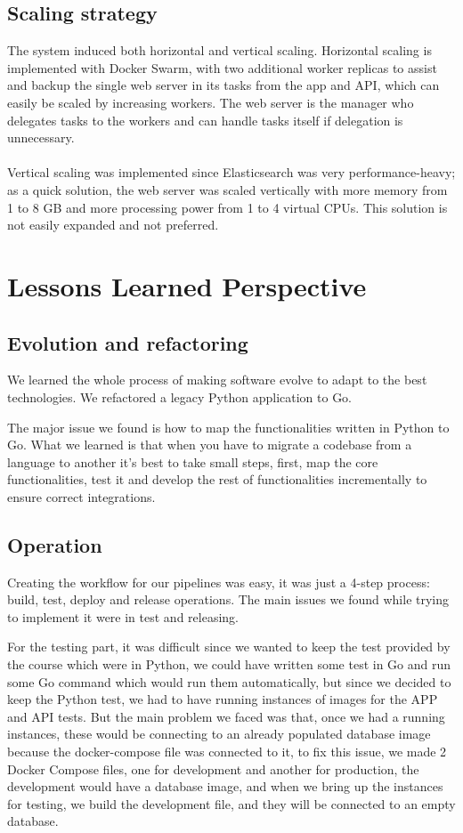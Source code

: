 \documentclass[12pt, a4paper, oneside]{book}
\begin{document}
\section{Scaling strategy}
The system induced both horizontal and vertical scaling.
Horizontal scaling is implemented with Docker Swarm, with two additional worker replicas to assist and backup the single web server in its tasks from the app and API, which can easily be scaled by increasing workers.
The web server is the manager who delegates tasks to the workers and can handle tasks itself if delegation is unnecessary.\\
\\
Vertical scaling was implemented since Elasticsearch was very performance-heavy; as a quick solution, the web server was scaled vertically with more memory from 1 to 8 GB and more processing power from 1 to 4 virtual CPUs.
This solution is not easily expanded and not preferred.

\chapter{Lessons Learned Perspective}

\section{Evolution and refactoring}
We learned the whole process of making software evolve to adapt to the best technologies. We refactored a legacy Python application to Go.\bigskip

The major issue we found is how to map the functionalities written in Python to Go. What we learned is that when you have to migrate a codebase from a language to another it's best to take small steps, first, map the core functionalities, test it and develop the rest of functionalities incrementally to ensure correct integrations.
\section{Operation}
Creating the workflow for our pipelines was easy, it was just a 4-step process: build, test, deploy and release operations.
The main issues we found while trying to implement it were in test and releasing. \bigskip

For the testing part, it was difficult since we wanted to keep the test provided by the course which were in Python, we could have written some test in Go and run some Go command which would run them automatically, but since we decided to keep the Python test, we had to have running instances of images for the APP and API tests. But the main problem we faced was that, once we had a running instances, these would be connecting to an already populated database image because the docker-compose file was connected to it, to fix this issue, we made 2 Docker Compose files, one for development and another for production, the development would have a database image, and when we bring up the instances for testing, we build the development file, and they will be connected to an empty database. \bigskip
\end{document}
